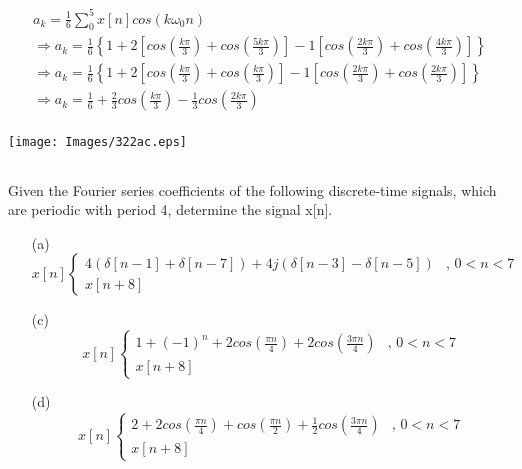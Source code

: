 \documentclass{article}
\begin{document}
\begin{enumerate}
            \begin{equation*}
                \begin{array}{l}
                    a_{k} =  \frac{1}{6}\sum\limits_{0}^{5} x[n]cos(k\omega_{0}n)  \\
                    \Rightarrow a_{k} = \frac{1}{6}\left\{ 1 + 2\left[cos(\frac{k\pi}{3})+cos(\frac{5k\pi}{3})\right] -1\left[cos(\frac{2k\pi}{3})+cos(\frac{4k\pi}{3})\right] \right\} \\
                    \Rightarrow a_{k} = \frac{1}{6}\left\{ 1 + 2\left[cos(\frac{k\pi}{3})+cos(\frac{k\pi}{3})\right] -1\left[cos(\frac{2k\pi}{3})+cos(\frac{2k\pi}{3})\right] \right\} \\
                    \Rightarrow a_{k} = \frac{1}{6} + \frac{2}{3}cos(\frac{k\pi}{3}) -\frac{1}{3}cos(\frac{2k\pi}{3}) \\
                \end{array}
            \end{equation*}
            \begin{minipage}{\textwidth}
                \centering
                \texttt{[image: Images/322ac.eps]}
            \end{minipage}
        \end{enumerate}
    \subsection{} Given the Fourier series coefficients of the following discrete-time signals, which are periodic with period 4, determine the signal x[n].
    \begin{enumerate}
        \item[(a)] 
        \begin{equation*}
            x[n]\left\{\begin{array}{ll}
                 4(\delta[n-1] + \delta[n-7]) + 4j(\delta[n-3] - \delta[n-5])&\textrm{, } 0 < n < 7  \\
                x[n+8]
            \end{array}\right.
        \end{equation*}
        \item[(c)] 
        \begin{equation*}
x[n]\left\{\begin{array}{ll}
                 1+{(-1)}^{n}+2cos\left(\frac{\pi n}{4}\right)+2cos\left(\frac{3\pi n}{4}\right)&\textrm{, } 0 < n < 7  \\
                x[n+8]
            \end{array}\right.
        \end{equation*}
        \item[(d)] 
        \begin{equation*}
x[n]\left\{\begin{array}{ll}
                 2+2cos\left(\frac{\pi n}{4}\right)+cos\left(\frac{\pi n}{2}\right)+\frac{1}{2}cos\left(\frac{3\pi n}{4}\right)&\textrm{, } 0 < n < 7  \\
                x[n+8]
            \end{array}\right.
        \end{equation*}
    \end{enumerate}
\end{document}
